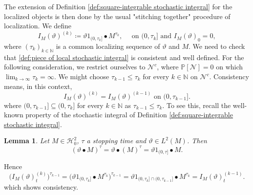 \documentclass[11pt,a4paper,twoside,openany]{report}
\numberwithin{equation}{section}
\theoremstyle{plain} %
\newtheorem{lemma}[theorem]{Lemma}
\theoremstyle{definition} %
\theoremstyle{remark} %
\begin{document}
The extension of Definition \ref{def:square-integrable stochastic integral} for the localized objects is then done by the usual "stitching together" procedure of localization. We define 
\begin{equation}\label{def:piece of local stochastic integral}
    I_M(\vartheta)^{(k)}\coloneqq \vartheta1_{(0,\tau_k]}\bullet M^{\tau_k},\quad \text{ on } (0,\tau_k] \text{ and } I_M(\vartheta)_0=0 ,
\end{equation}
where \((\tau_k)_{k\in\mathbb{N}}\) is a common localizing sequence of \(\vartheta\) and \(M\). We need to check that \eqref{def:piece of local stochastic integral} is consistent and well defined. For the following consideration, we restrict ourselves to \(\mathcal{N}^c\), where \(\mathbb{P}[\mathcal{N}]=0\) on which \(\lim_{k\to\infty}\tau_k=\infty\). We might choose \(\tau_{k-1}\leq\tau_{k}\) for every \(k\in\mathbb{N}\) on \(\mathcal{N}^c\). Consistency means, in this context,
\begin{equation*}
    I_M(\vartheta)^{(k)}=I_M(\vartheta)^{(k-1)}\text{ on } (0,\tau_{k-1}].
\end{equation*}
where \((0,\tau_{k-1}]\subseteq(0,\tau_{k}]\)
for every \(k\in\mathbb{N}\) as \(\tau_{k-1}\leq \tau_{k}\). To see this, recall the well-known property of the stochastic integral of Definition \ref{def:square-integrable stochastic integral}.
\begin{lemma}\label{lemma:stopping stochastic integrals}
    Let \(M\in\mathcal{H}_0^2\), \(\tau\) a stopping time and \(\vartheta\in L^2(M)\). Then
\begin{equation*}
    (\vartheta\bullet M)^{\tau}=\vartheta\bullet(M)^{\tau}=\vartheta1_{(0,\tau]}\bullet M.
\end{equation*}
\end{lemma}
Hence
\begin{equation*}
\big(I_M(\vartheta)^{(k)}_t\big)^{\tau_{k-1}}=\big(\vartheta1_{(0,\tau_k]}\bullet M^{\tau_k}\big)^{\tau_{k-1}}=\vartheta1_{(0,\tau_k]\cap(0,\tau_{k-1}]}\bullet M^{\tau_k}=I_M(\vartheta)^{(k-1)}_t.
\end{equation*}
which shows consistency. 
\end{document}
